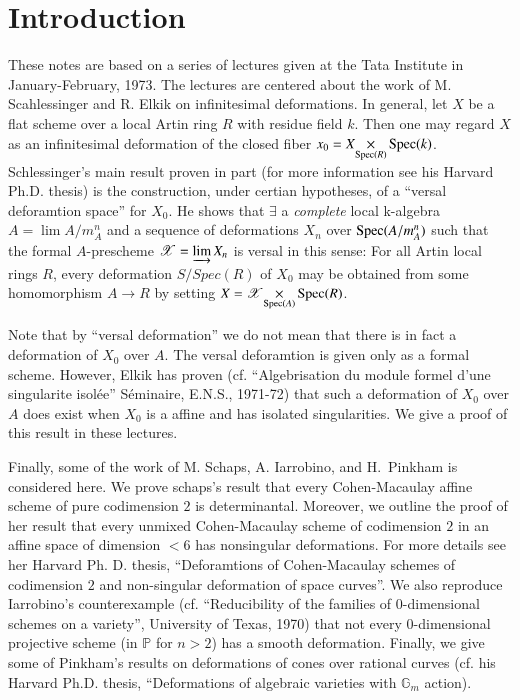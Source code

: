 \chapter{Introduction}


These notes are based on a series of lectures given at the Tata
Institute in January-February, 1973. The lectures are centered about
the work of M. Scahlessinger and R. Elkik on infinitesimal
deformations. In general, let $X$ be a flat scheme over a local Artin
ring $R$ with residue field $k$. Then one may regard $X$ as an
infinitesimal deformation of the closed fiber
$x_{0}=\fprod{X}{\Spec(k)}{\Spec (R)}$. 
Schlessinger's main result
proven in part (for more information see his Harvard Ph.D. thesis) is
the construction, under certian hypotheses, of a ``versal deforamtion
space'' for $X_{0}$. He shows that $\exists$ a {\em complete}
local k-algebra $A=\lim A/m_{A}^{n}$ and a sequence of deformations
$X_{n}$ over $\operatorname{Spec}(A/m_{A}^{n})$ such that the formal $A$-prescheme
$\mathscr{X}=\varinjlim X_{n}$ is versal in this sense: For all Artin
local rings $R$, every deformation $S/Spec(R)$ of $X_{0}$ may be
obtained from some homomorphism $A\to R$ by setting
$X=\fprod{\mathscr{X}}{\Spec (R)}{\Spec (A)}$. 

Note that by ``versal deformation'' we do not mean that there is in
fact a deformation of $X_{0}$ over $A$. The versal deforamtion is
given only as a formal scheme. However, Elkik has proven
(cf. ``Algebrisation du module formel d'une singularite isol\'{e}e''
S\'{e}minaire, E.N.S., 1971-72) that such a deformation of $X_{0}$
over $A$ does exist when $X_{0}$ is a affine and has isolated
singularities. We give a proof of this result in these lectures.

Finally, some of the work of M. Schaps, A. Iarrobino, and H.~Pin\-kham
is considered here. We prove schaps's result that every Cohen-Macaulay
affine scheme of pure codimension $2$ is determinantal. Moreover, we
outline the proof of her result that every unmixed Cohen-Macaulay
scheme of codimension $2$ in an affine space of dimension $<6$ has
nonsingular deformations. For more details see  her
Harvard Ph. D. thesis, ``Deforamtions of Cohen-Macaulay schemes of
codimension $2$ and non-singular deformation of space curves''. We
also reproduce Iarrobino's counterexample (cf. ``Reducibility of the
families of $0$-dimensional schemes on a variety'', University of
Texas, 1970) that not every $0$-dimensional projective scheme (in
$\mathbb{P}$ for $n>2$) has a smooth deformation. Finally, we give
some of Pinkham's results on deformations of cones over rational
curves (cf. his Harvard Ph.D. thesis, ``Deformations of algebraic
varieties with $\mathbb{G}_{m}$ action).

